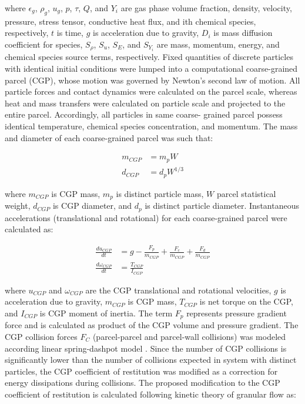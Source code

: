 where $\epsilon_g$, $\rho_g$, $u_g$, $p$, $\tau$, $Q$, and $Y_i$ are gas phase volume fraction, density, velocity, pressure, stress tensor, conductive heat flux, and ith chemical species, respectively, $t$ is time, $g$ is acceleration due to gravity, $D_i$ is mass diffusion coefficient for species, $S_\rho$, $S_u$, $S_E$, and $S_{Y_i}$ are mass, momentum, energy, and chemical species source terms, respectively. Fixed quantities of discrete particles with identical initial conditions were lumped into a computational coarse-grained parcel (CGP), whose motion was governed by Newton’s second law of motion. All particle forces and contact dynamics were calculated on the parcel scale, whereas heat and mass transfers were calculated on particle scale and projected to the entire parcel. Accordingly, all particles in same coarse- grained parcel possess identical temperature, chemical species concentration, and momentum. The mass and diameter of each coarse-grained parcel was such that:

\begin{align}
    m_{CGP} &= m_p W \\
    d_{CGP} &= d_p W^{1/3}
\end{align}

where $m_{CGP}$ is CGP mass, $m_p$ is distinct particle mass, $W$ parcel statistical weight, $d_{CGP}$ is CGP diameter, and $d_p$ is distinct particle diameter. Instantaneous accelerations (translational and rotational) for each coarse-grained parcel were calculated as:

\begin{align}
    \frac{d u_{CGP}}{dt} &= g - \frac{F_p}{m_{CGP}} + \frac{F_c}{m_{CGP}} + \frac{F_d}{m_{CGP}} \\
    \frac{d \omega_{CGP}}{dt} &= \frac{T_{CGP}}{I_{CGP}}
\end{align}

where $u_{CGP}$ and $\omega_{CGP}$ are the CGP translational and rotational velocities, $g$ is acceleration due to gravity, $m_{CGP}$ is CGP mass, $T_{CGP}$ is net torque on the CGP, and $I_{CGP}$ is CGP moment of inertia. The term $F_p$ represents pressure gradient force and is calculated as product of the CGP volume and pressure gradient. The CGP collision forces $F_C$ (parcel-parcel and parcel-wall collisions) was modeled according linear spring-dashpot model \cite{Navarro-2013}. Since the number of CGP collisions is significantly lower than the number of collisions expected in system with distinct particles, the CGP coefficient of restitution was modified as a correction for energy dissipations during collisions. The proposed modification to the CGP coefficient of restitution is calculated following kinetic theory of granular flow \cite{Lu-2014} as:

